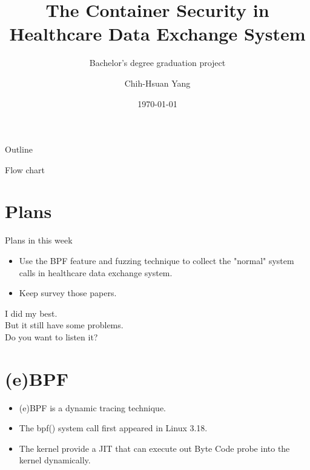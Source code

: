 \documentclass{beamer}
\title{The Container Security in Healthcare Data Exchange System}
\subtitle{Bachelor's degree graduation project}
\author{Chih-Hsuan Yang}
\institute{National Sun Yat-sen University\\
Advisor: Chun-I Fan
}
\date{\today}
\begin{document}
\begin{CJK*}{UTF8}{bsmi}

  \begin{frame}
    \titlepage
  \end{frame}


  \begin{frame}{Outline}
    \begin{multicols}{2}
      \tableofcontents
    \end{multicols}
  \end{frame}

  \begin{frame}{Flow chart}
    \centering
    \scalebox{0.9} {
    }
  \end{frame}

  \section{Plans}
  \begin{frame}{Plans in this week}
    \begin{itemize}
      \item Use the BPF feature and fuzzing technique to collect the "normal" system calls in healthcare data exchange system.
      \item Keep survey those papers.
    \end{itemize}
  \end{frame}

  \begin{frame}
    \centering
    \Huge
    I did my best.\\
    But it still have some problems.\\
    Do you want to listen it?
  \end{frame}

  \section{(e)BPF}
  \begin{frame}
    \begin{itemize}
      \item (e)BPF is a dynamic tracing technique.
      \item The bpf() system call first appeared in Linux 3.18.
      \item The kernel provide a JIT that can execute out Byte Code probe into the kernel dynamically.
    \end{itemize}
  \end{frame}


\end{CJK*}
\end{document}
